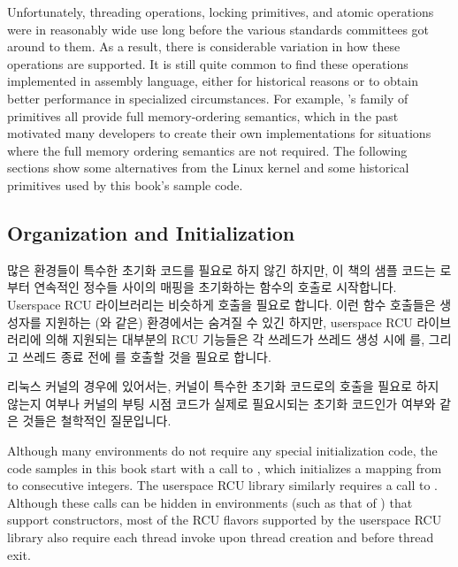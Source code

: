 Unfortunately, threading operations, locking primitives, and atomic
operations were in reasonably wide use long before the various standards
committees got around to them.
As a result, there is considerable variation in how these operations
are supported.
It is still quite common to find these operations implemented in
assembly language, either for historical reasons or to obtain better
performance in specialized circumstances.
For example, \GCC's  family of primitives all provide full
memory-ordering semantics, which in the past motivated many developers
to create their own implementations for situations where the full memory
ordering semantics are not required.
The following sections show some alternatives from the Linux kernel
and some historical primitives used by this book's sample code.
\fi

\subsection{Organization and Initialization}
\label{sec:toolsoftrade:Organization and Initialization}

많은 환경들이 특수한 초기화 코드를 필요로 하지 않긴 하지만, 이 책의 샘플 코드는
 로부터 연속적인 정수들 사이의 매핑을 초기화하는 
함수의 호출로 시작합니다.
Userspace RCU 라이브러리는 비슷하게  호출을 필요로 합니다.
이런 함수 호출들은 생성자를 지원하는 (\GCC 와 같은) 환경에서는 숨겨질 수 있긴
하지만, userspace RCU 라이브러리에 의해 지원되는 대부분의 RCU 기능들은 각
쓰레드가 쓰레드 생성 시에  를, 그리고 쓰레드 종료
전에  를 호출할 것을 필요로 합니다.

리눅스 커널의 경우에 있어서는, 커널이 특수한 초기화 코드로의 호출을 필요로 하지
않는지 여부나 커널의 부팅 시점 코드가 실제로 필요시되는 초기화 코드인가 여부와
같은 것들은 철학적인 질문입니다.
\iffalse

Although many environments do not require any special initialization
code, the code samples in this book start with a call to ,
which initializes a mapping from  to consecutive integers.
The userspace RCU library similarly requires a call to .
Although these calls can be hidden in environments (such as that of
\GCC) that support constructors,
most of the RCU flavors supported by the userspace RCU library
also require each thread invoke  upon thread
creation and  before thread exit.

